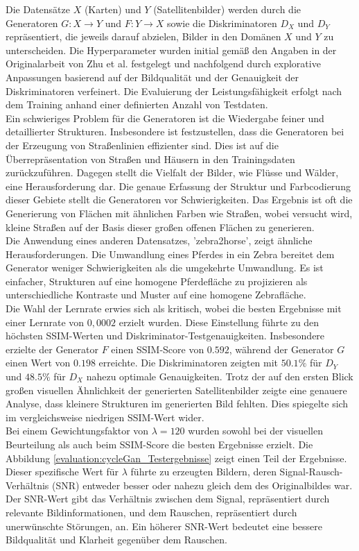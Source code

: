 Die Datensätze $X$ (Karten) und $Y$ (Satellitenbilder) werden durch die Generatoren $G: X\rightarrow Y$ und $F: Y\rightarrow X$ sowie die Diskriminatoren $D_X$ und $D_Y$ repräsentiert, die jeweils darauf abzielen, Bilder in den Domänen $X$ und $Y$ zu unterscheiden. Die Hyperparameter wurden initial gemäß den Angaben in der Originalarbeit von Zhu et al. \cite{Zhu.2017} festgelegt und nachfolgend durch explorative Anpassungen basierend auf der Bildqualität und der Genauigkeit der Diskriminatoren verfeinert. Die Evaluierung der Leistungsfähigkeit erfolgt nach dem Training anhand einer definierten Anzahl von Testdaten.
\\\newline
Ein schwieriges Problem für die Generatoren ist die Wiedergabe feiner und detaillierter Strukturen. Insbesondere ist festzustellen, dass die Generatoren bei der Erzeugung von Straßenlinien effizienter sind. Dies ist auf die Überrepräsentation von Straßen und Häusern in den Trainingsdaten zurückzuführen. Dagegen stellt die Vielfalt der Bilder, wie Flüsse und Wälder, eine Herausforderung dar. Die genaue Erfassung der Struktur und Farbcodierung dieser Gebiete stellt die Generatoren vor Schwierigkeiten. Das Ergebnis ist oft die Generierung von Flächen mit ähnlichen Farben wie Straßen, wobei versucht wird, kleine Straßen auf der Basis dieser großen offenen Flächen zu generieren.
\\
Die Anwendung eines anderen Datensatzes, 'zebra2horse', zeigt ähnliche Herausforderungen. Die Umwandlung eines Pferdes in ein Zebra bereitet dem Generator weniger Schwierigkeiten als die umgekehrte Umwandlung. Es ist einfacher, Strukturen auf eine homogene Pferdefläche zu projizieren als unterschiedliche Kontraste und Muster auf eine homogene Zebrafläche.
\\\newline
Die Wahl der Lernrate erwies sich als kritisch, wobei die besten Ergebnisse mit einer Lernrate von $0,0002$ erzielt wurden. Diese Einstellung führte zu den höchsten SSIM-Werten und Diskriminator-Testgenauigkeiten. Insbesondere erzielte der Generator $F$ einen SSIM-Score von $0.592$, während der Generator $G$ einen Wert von $0.198$ erreichte. Die Diskriminatoren zeigten mit $50.1\%$ für $D_Y$ und $48.5\%$ für $D_X$ nahezu optimale Genauigkeiten. Trotz der auf den ersten Blick großen visuellen Ähnlichkeit der generierten Satellitenbilder zeigte eine genauere Analyse, dass kleinere Strukturen im generierten Bild fehlten. Dies spiegelte sich im vergleichsweise niedrigen SSIM-Wert wider.
\\\newline
Bei einem Gewichtungsfaktor von $\lambda = 120$ wurden sowohl bei der visuellen Beurteilung als auch beim SSIM-Score die besten Ergebnisse erzielt.
Die Abbildung \ref{evaluation:cycleGan_Testergebnisse} zeigt einen Teil der Ergebnisse.
Dieser spezifische Wert für $\lambda$ führte zu erzeugten Bildern, deren Signal-Rausch-Verhältnis (SNR) entweder besser oder nahezu gleich dem des Originalbildes war. Der SNR-Wert gibt das Verhältnis zwischen dem Signal, repräsentiert durch relevante Bildinformationen, und dem Rauschen, repräsentiert durch unerwünschte Störungen, an. Ein höherer SNR-Wert bedeutet eine bessere Bildqualität und Klarheit gegenüber dem Rauschen.

